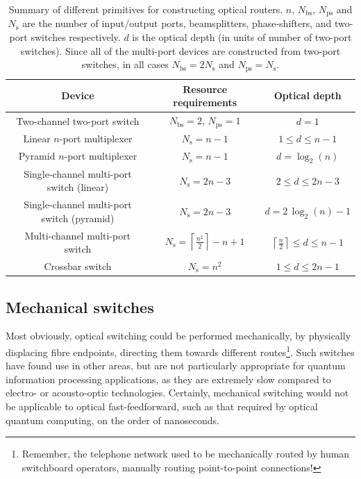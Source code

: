 \startnormtable
\begin{table}[!htbp]
	\begin{tabular}{|c|c|c|}
		\hline
  		Device & Resource requirements & Optical depth \\
  		\hline
  		\hline
  		Two-channel two-port switch & \mbox{$N_\mathrm{bs}=2$}, \mbox{$N_\mathrm{ps}=1$} & \mbox{$d=1$} \\
  		Linear $n$-port multiplexer & \mbox{$N_\mathrm{s}=n-1$} & \mbox{$1\leq d\leq n-1$} \\
  		Pyramid $n$-port multiplexer & \mbox{$N_\mathrm{s}=n-1$} & \mbox{$d=\log_2(n)$} \\
    	Single-channel multi-port switch (linear) & \mbox{$N_\mathrm{s}=2n-3$} & \mbox{$2\leq d\leq 2n-3$} \\
  		Single-channel multi-port switch (pyramid) & \mbox{$N_\mathrm{s}=2n-3$} & \mbox{$d=2\,\log_2(n)-1$} \\
  		Multi-channel multi-port switch & \mbox{$N_\mathrm{s} = \left\lceil \frac{n^2}{2}\right\rceil - n + 1$} & \mbox{$\left\lceil \frac{n}{2} \right\rceil \leq d\leq n-1$} \\
  		Crossbar switch & \mbox{$N_\mathrm{s}=n^2$} & \mbox{$1\leq d\leq 2n-1$}\\
    	\hline
	\end{tabular}
	\captionspacetab \caption{Summary of different primitives for constructing optical routers. $n$, $N_\mathrm{bs}$, $N_\mathrm{ps}$ and $N_\mathrm{s}$ are the number of input/output ports, beamsplitters, phase-shifters, and two-port switches respectively. $d$ is the optical depth (in units of number of two-port switches). Since all of the multi-port devices are constructed from two-port switches, in all cases \mbox{$N_\mathrm{bs} = 2 N_\mathrm{s}$} and \mbox{$N_\mathrm{ps} = N_\mathrm{s}$}.} \label{tab:router_summary} 
\end{table}
\startalgtable

%
%

\subsection{Mechanical switches}

Most obviously, optical switching could be performed mechanically, by physically displacing fibre endpoints, directing them towards different routes\footnote{Remember, the telephone network used to be mechanically routed by human switchboard operators, manually routing point-to-point connections!}. Such switches have found use in other areas, but are not particularly appropriate for quantum information processing applications, as they are extremely slow compared to electro- or acousto-optic technologies. Certainly, mechanical switching would not be applicable to optical fast-feedforward, such as that required by optical quantum computing, on the order of nanoseconds.

